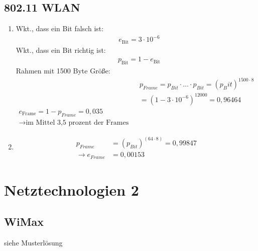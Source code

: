 \subsection{802.11 WLAN}
\begin{enumerate}
\item 
Wkt., dass ein Bit falsch ist: 
\begin{align*}
&e_{\text{Bit}} = 3 \cdot 10^{-6}
\end{align*}
Wkt., dass ein Bit richtig ist: 
\begin{align*}
&p_{\text{Bit}} = 1- e_{\text{Bit}}
\end{align*}
Rahmen mit 1500 Byte Größe:
\begin{align*}
&p_{Frame} = p_{Bit} \cdot \ldots \cdot p_{Bit} = (p_Bit)^{1500 \cdot 8} \\
&= (1-3\cdot 10^{-6})^{12000} = 0,96464 \\
e_{\text{Frame}} = 1-p_{Frame} = 0,035\\
\to \text{im Mittel 3,5 prozent der Frames fehlerhaft.}
\end{align*}
\item 
\begin{align*}
p_{Frame} &= (p_{Bit})^{(64\cdot 8)} = 0,99847\\
\to e_{Frame} &= 0,00153
\end{align*}
\end{enumerate}

\section{Netztechnologien 2}
\subsection{WiMax}
siehe Musterlösung
